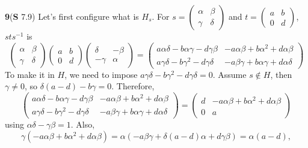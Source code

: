 \documentclass[a4paper, 12pt]{article}
\theoremstyle{Mydefinition}
\theoremstyle{Mytheorem}
\begin{document}
\noindent \textbf{9}(\textbf{S} 7.9)
    Let's first configure what is $H_s$. For $s = \begin{pmatrix}\alpha & \beta\\ \gamma & \delta
    \end{pmatrix}$ and $t = \begin{pmatrix}
    a & b\\ 0 & d
    \end{pmatrix}$, $sts^{-1}$ is
\begin{equation}
    \begin{pmatrix}
    \alpha & \beta\\
    \gamma & \delta
    \end{pmatrix}\begin{pmatrix}
    a & b \\ 0 & d
    \end{pmatrix}\begin{pmatrix}
    \delta & -\beta\\
    -\gamma & \alpha
    \end{pmatrix} = \begin{pmatrix}
    a\alpha\delta - b\alpha\gamma - d\gamma\beta & -a\alpha\beta + b\alpha^2+d\alpha\beta\\
    a\gamma\delta - b\gamma^2 - d\gamma\delta & -a\beta\gamma + b\alpha\gamma + d\alpha\delta
    \end{pmatrix}
\end{equation}
To make it in $H$, we need to impose $a\gamma\delta - b\gamma^2 - d\gamma\delta = 0$. Assume $s\not\in H$, then $\gamma\neq 0$, so $\delta(a-d)-b\gamma = 0$. Therefore,
\begin{equation}
    \begin{pmatrix}
    a\alpha\delta - b\alpha\gamma - d\gamma\beta & -a\alpha\beta + b\alpha^2+d\alpha\beta\\
    a\gamma\delta - b\gamma^2 - d\gamma\delta & -a\beta\gamma + b\alpha\gamma + d\alpha\delta
    \end{pmatrix} = \begin{pmatrix}
    d & -a\alpha\beta + b\alpha^2+d\alpha\beta\\
    0 & a
    \end{pmatrix}
\end{equation}
using $\alpha\delta-\gamma\beta = 1$. Also,
\begin{equation}
    \gamma(-a\alpha\beta + b\alpha^2+d\alpha\beta) = \alpha(-a\beta\gamma + \delta(a-d)\alpha + d\gamma\beta) = \alpha(a-d),
\end{equation}
\end{document}
